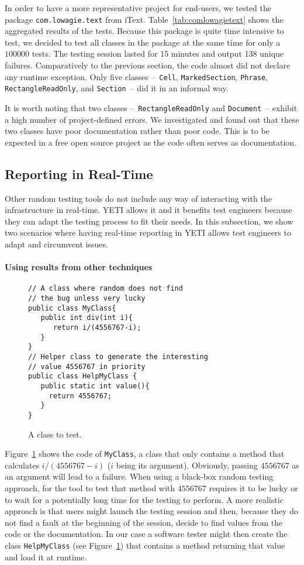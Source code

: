 In order to have a more representative project for end-users, we tested the package \texttt{com.lowagie.text} from iText. Table~\ref{tab:comlowagietext} shows the aggregated results of the tests. Because this package is quite time intensive to test, we decided to test all classes in the package at the same time for only a $100000$ tests. The testing session lasted for 15 minutes and output 138 unique failures. Comparatively to the previous section, the code almost did not declare any runtime exception. Only five classes --~\texttt{Cell}, \texttt{MarkedSection}, \texttt{Phrase}, \texttt{RectangleReadOnly}, and \texttt{Section}~-- did it in an informal way. 

It is worth noting that two classes --~\texttt{RectangleReadOnly}  and \texttt{Document}~-- exhibit a high number of project-defined errors. We investigated and found out that these two classes have poor documentation rather than poor code. This is to be expected in a free open source project as the code often serves as documentation.

\subsection{Reporting in Real-Time}

Other random testing tools do not include any way of interacting with the infrastructure in real-time.
YETI allows it and it benefits test engineers because they can adapt the testing process to fit their needs. In this subsection, we show two scenarios where having real-time reporting in YETI allows test engineers to adapt and circumvent issues.

\paragraph{Using results from other techniques}
\begin{figure}[ht!]
{\small
\begin{verbatim}
// A class where random does not find 
// the bug unless very lucky
public class MyClass{
   public int div(int i){
      return i/(4556767-i);
   }
}
// Helper class to generate the interesting 
// value 4556767 in priority
public class HelpMyClass {
   public static int value(){
     return 4556767; 
   }
}
\end{verbatim}
}
\caption{A class to test.}\label{fig:myClass}
\end{figure}

Figure~\ref{fig:myClass} shows the code of \texttt{MyClass}, a class that only contains a method that calculates $i/(4556767-i)$ ($i$ being its argument). Obviously, passing $4556767$ as an argument will lead to a failure. When using a black-box random testing approach, for the tool to test that method with $4556767$ 
requires it to be lucky or to wait for a potentially long time for the testing to perform. 
A more realistic approach is that users might launch the testing session and then, because they do not find a fault at the beginning of the session, decide to find values from the code or the documentation. In our case a software tester might then create the class \texttt{HelpMyClass} (see Figure~\ref{fig:myClass}) that contains a method returning that value and load it at runtime.

